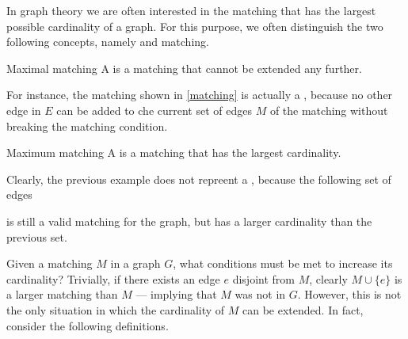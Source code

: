 \documentclass[a4paper, 12pt]{report}
\begin{document}
    In graph theory we are often interested in the matching that has the largest possible cardinality of a graph. For this purpose, we often distinguish the two following concepts, namely  and  matching.

    \begin{frameddefn}{Maximal matching}
        A  is a matching that cannot be extended any further.
    \end{frameddefn}
    
    For instance, the matching shown in \cref{matching} is actually a , because no other edge in $E$ can be added to che current set of edges $M$ of the matching without breaking the matching condition.

    \begin{frameddefn}{Maximum matching}
        A  is a matching that has the largest cardinality.
    \end{frameddefn}

    Clearly, the previous example does not repreent a , because the following set of edges

     \begin{figure}[H]
        \centering
    \end{figure}

    is still a valid matching for the graph, but has a larger cardinality than the previous set.

    Given a matching $M$ in a graph $G$, what conditions must be met to increase its cardinality? Trivially, if there exists an edge $e$ disjoint from $M$, clearly $M \cup \{e\}$ is a larger matching than $M$ --- implying that $M$ was not  in $G$. However, this is not the only situation in which the cardinality of $M$ can be extended. In fact, consider the following definitions.
\end{document}
